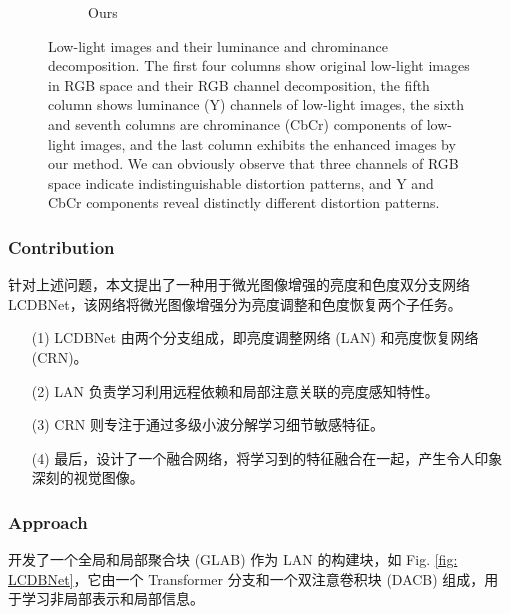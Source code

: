 \documentclass[letterpaper,10pt]{article}
\begin{document}
\begin{figure}[htbp]
\begin{subfigure}{0.11\textwidth}
					\captionsetup{font=scriptsize}
					\caption*{Ours}
					\label{fig: Our3}
				\end{subfigure}
				\captionsetup{font=scriptsize}
				\caption{
					\label{fig: Low-light images and their luminance and chrominance decomposition}
					Low-light images and their luminance and chrominance decomposition. The first four columns show original low-light images in
					RGB space and their RGB channel decomposition, the fifth column shows luminance (Y) channels of low-light images, the sixth and seventh
					columns are chrominance (CbCr) components of low-light images, and the last column exhibits the enhanced images by our method. We
					can obviously observe that three channels of RGB space indicate indistinguishable distortion patterns, and Y and CbCr components reveal
					distinctly different distortion patterns.
				}
			\end{figure}
			
			\subsubsection{Contribution}
			
			针对上述问题，本文提出了一种用于微光图像增强的亮度和色度双分支网络 LCDBNet，该网络将微光图像增强分为亮度调整和色度恢复两个子任务。
			
			\begin{itemize}
				\item[(1)] 
				LCDBNet 由两个分支组成，即亮度调整网络 (LAN) 和亮度恢复网络 (CRN)。
				
				\item[(2)]
				LAN 负责学习利用远程依赖和局部注意关联的亮度感知特性。
				
				\item[(3)]
				CRN 则专注于通过多级小波分解学习细节敏感特征。
				
				\item[(4)]
				最后，设计了一个融合网络，将学习到的特征融合在一起，产生令人印象深刻的视觉图像。
			\end{itemize}	
			
			\subsubsection{Approach}
			
			开发了一个全局和局部聚合块 (GLAB) 作为 LAN 的构建块，如 Fig. \ref{fig: LCDBNet}，它由一个 Transformer 分支和一个双注意卷积块 (DACB) 组成，用于学习非局部表示和局部信息。
			
\end{document}
